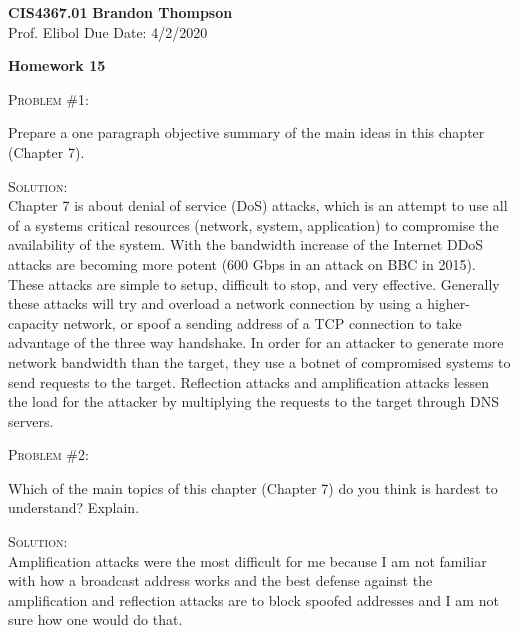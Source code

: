 \documentclass[12pt]{article}
\newenvironment{problem}[1]
{\begin{mdframed}[linewidth=0.8pt]
        \textsc{Problem #1:}

}
    {\end{mdframed}}
\newenvironment{solution}
    {\textsc{Solution:}\\}
    {\newpage}%
\begin{document}
\noindent
\textbf{CIS4367.01} \hfill \textbf{Brandon Thompson} \\
\normalsize Prof. Elibol \hfill Due Date: 4/2/2020 \\

\begin{center}
\textbf{Homework 15}
\end{center}
	\begin{problem}{\#1}
		Prepare a one paragraph objective summary of the main ideas in this chapter (Chapter 7).
	\end{problem}
	\begin{solution}
		Chapter 7 is about denial of service (DoS) attacks, which is an attempt to use all of a systems critical resources (network, system, application) to compromise the availability of the system. With the bandwidth increase of the Internet DDoS attacks are becoming more potent (600 Gbps in an attack on BBC in 2015). These attacks are simple to setup, difficult to stop, and very effective. Generally these attacks will try and overload a network connection by using a higher-capacity network, or spoof a sending address of a TCP connection to take advantage of the three way handshake. In order for an attacker to generate more network bandwidth than the target, they use a botnet of compromised systems to send requests to the target. Reflection attacks and amplification attacks lessen the load for the attacker by multiplying the requests to the target through DNS servers.
	\end{solution}

	\begin{problem}{\#2}
		Which of the main topics of this chapter (Chapter 7) do you think is hardest to understand? Explain.
	\end{problem}
	\begin{solution}
		Amplification attacks were the most difficult for me because I am not familiar with how a broadcast address works and the best defense against the amplification and reflection attacks are to block spoofed addresses and I am not sure how one would do that.
	\end{solution}
\end{document}
